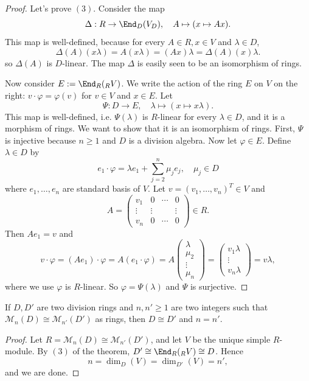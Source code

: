 \begin{proof}
Let's prove $(3)$. Consider the map 
\[\Delta:R\to\End_D(V_D),\quad A\mapsto(x\mapsto Ax).\]
This map is well-defined, because for every $A\in R,x\in V$ and $\lambda\in D$,
\[\Delta(A)(x\lambda)=A(x\lambda)=(Ax)\lambda=\Delta(A)(x)\lambda.\]
so $\Delta(A)$ is $D$-linear. The map $\Delta$ is easily seen to be an isomorphism of rings.\par
Now consider $E:=\End_R(_{R}V)$. We write the action of the ring $E$ on $V$ on the right: $v\cdot\varphi=\varphi(v)$ for $v\in V$ and $x\in E$. Let 
\[\Psi:D\to E,\quad \lambda\mapsto(x\mapsto x\lambda).\]
This map is well-defined, i.e. $\Psi(\lambda)$ is $R$-linear for every $\lambda\in D$, and it is a morphism of rings. We want to show that it is an isomorphism of rings. First, $\Psi$ is injective because $n\geq1$ and $D$ is a division algebra. Now let $\varphi\in E$. Define $\lambda\in D$ by
\[e_1\cdot\varphi=\lambda e_1+\sum_{j=2}^{n}\mu_je_j,\quad \mu_j\in D\]
where $e_1,\dots,e_n$ are standard basis of $V$. Let $v=(v_1,\dots,v_n)^T\in V$ and
\[A=\begin{pmatrix}
v_1&0&\cdots&0\\
\vdots&\vdots&&\vdots\\
v_n&0&\cdots&0
\end{pmatrix}\in R.\]
Then $Ae_1=v$ and
\[v\cdot\varphi=(Ae_1)\cdot\varphi=A(e_1\cdot\varphi)=A\begin{pmatrix}
\lambda\\
\mu_2\\
\vdots\\
\mu_n
\end{pmatrix}=\begin{pmatrix}
v_1\lambda\\
\vdots\\
v_n\lambda
\end{pmatrix}=v\lambda,\]
where we use $\varphi$ is $R$-linear. So $\varphi=\Psi(\lambda)$ and $\Psi$ is surjective.
\end{proof}
\begin{corollary}\label{division matrix ring unique}
If $D,D'$ are two division rings and $n,n'\geq1$ are two integers such that
$\mathcal{M}_n(D)\cong\mathcal{M}_{n'}(D')$ as rings, then $D\cong D'$ and $n=n'$.
\end{corollary}
\begin{proof}
Let $R=\mathcal{M}_n(D)\cong\mathcal{M}_{n'}(D')$, and let $V$ be the unique simple $R$-module. By $(3)$ of the theorem, $D'\cong\End_R(_{R}V)\cong D$. Hence
\[n=\dim_D(V)=\dim_{D'}(V)=n',\]
and we are done.
\end{proof}
